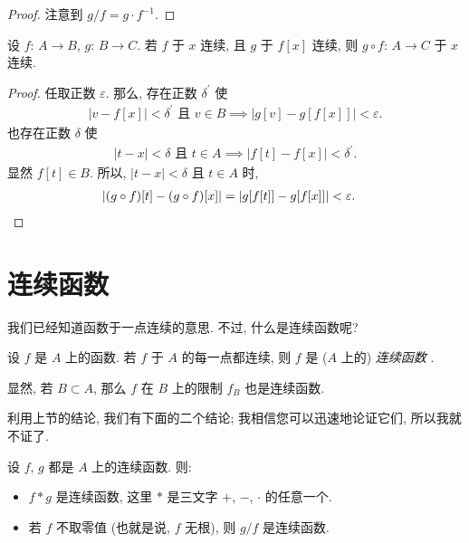 \begin{proof}
    注意到 $g/f = g \cdot f^{-1}$.
\end{proof}

\begin{theorem}
    设 $f$: $A \to B$, $g$: $B \to C$.
    若 $f$ 于 $x$ 连续, 且 $g$ 于 $f[x]$ 连续,
    则 $g \circ f$: $A \to C$ 于 $x$ 连续.
\end{theorem}

\begin{proof}
    任取正数 $\varepsilon$.
    那么, 存在正数 $\delta^{\prime}$ 使
    \begin{align*}
        \text{$|v - f[x]| < \delta^{\prime}$ 且 $v \in B$} \implies |g[v] - g[f[x]]| < \varepsilon.
    \end{align*}
    也存在正数 $\delta$ 使
    \begin{align*}
        \text{$|t - x| < \delta$ 且 $t \in A$} \implies |f[t] - f[x]| < \delta^{\prime}.
    \end{align*}
    显然 $f[t] \in B$.
    所以, $|t - x| < \delta$ 且 $t \in A$ 时,
    \begin{align*}
         & {|(g \circ f)[t] - (g \circ f)[x]| = |g[f[t]] - g[f[x]]| < \varepsilon.} \qedhere
    \end{align*}
\end{proof}

\section{连续函数}

我们已经知道函数于一点连续的意思.
不过, 什么是连续函数呢?

\begin{definition}
    设 $f$ 是 $A$ 上的函数.
    若 $f$ 于 $A$ 的每一点都连续,
    则 $f$ 是 ($A$ 上的) \emph{连续函数}%
    .
\end{definition}

\begin{remark}
    显然, 若 $B \subset A$,
    那么 $f$ 在 $B$ 上的限制 $f_B$ 也是连续函数.
\end{remark}

利用上节的结论, 我们有下面的二个结论;
我相信您可以迅速地论证它们, 所以我就不证了.

\begin{theorem}
    设 $f$, $g$ 都是 $A$ 上的连续函数. 则:
    \begin{itemize}
        \item $f \ast g$ 是连续函数,
              这里 $\ast$ 是三文字 $+$, $-$, $\cdot$ 的任意一个.
        \item 若 $f$ 不取零值 (也就是说, $f$ 无根),
              则 $g/f$ 是连续函数.
    \end{itemize}
\end{theorem}


